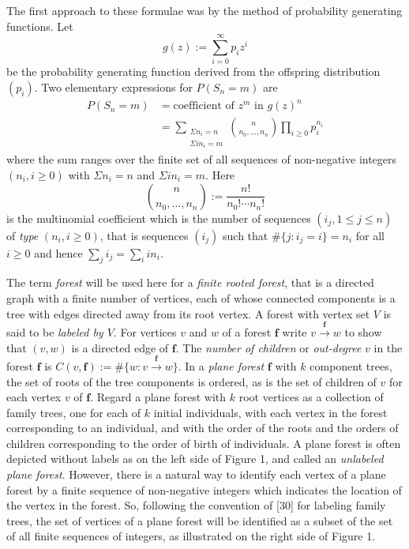 The first approach to these formulae was by the method of probability generating functions. Let
\[
g(z):=\sum_{i=0}^{\infty} p_i z^i \tag{6}
\]
be the probability generating function derived from the offspring distribution $(p_i)$. Two elementary expressions for $P(S_n=m)$ are
\begin{align}
P(S_n=m)&=\text{coefficient of } z^m \text{ in } g(z)^n \tag{7}\\
&=\sum_{\substack{\Sigma n_i=n\\ \Sigma i n_i=m}} \binom{n}{n_0,\ldots,n_n}\prod_{i\ge 0} p_i^{n_i} \tag{8}
\end{align}
where the sum ranges over the finite set of all sequences of non-negative integers $(n_i,i\ge 0)$ with $\Sigma n_i=n$ and $\Sigma i n_i=m$. Here
\[
\binom{n}{n_0,\ldots,n_n}:=\frac{n!}{n_0!\cdots n_n!} \tag{9}
\]
is the multinomial coefficient which is the number of sequences $(i_j,1\le j\le n)$ of \emph{type} $(n_i,i\ge 0)$, that is sequences $(i_j)$ such that $\#\{j: i_j=i\}=n_i$ for all $i\ge 0$ and hence $\sum_j i_j=\sum_i i n_i$.

The term \emph{forest} will be used here for a \emph{finite rooted forest}, that is a directed graph with a finite number of vertices, each of whose connected components is a tree with edges directed away from its root vertex. A forest with vertex set $V$ is said to be \emph{labeled by $V$}. For vertices $v$ and $w$ of a forest $\mathbf{f}$ write $v\xrightarrow{\mathbf{f}} w$ to show that $(v,w)$ is a directed edge of $\mathbf{f}$. The \emph{number of children} or \emph{out-degree} $v$ in the forest $\mathbf{f}$ is $C(v,\mathbf{f}):=\#\{w: v\xrightarrow{\mathbf{f}} w\}$. In a \emph{plane forest} $\mathbf{f}$ with $k$ component trees, the set of roots of the tree components is ordered, as is the set of children of $v$ for each vertex $v$ of $\mathbf{f}$. Regard a plane forest with $k$ root vertices as a collection of family trees, one for each of $k$ initial individuals, with each vertex in the forest corresponding to an individual, and with the order of the roots and the orders of children corresponding to the order of birth of individuals. A plane forest is often depicted without labels as on the left side of Figure 1, and called an \emph{unlabeled plane forest}. However, there is a natural way to identify each vertex of a plane forest by a finite sequence of non-negative integers which indicates the location of the vertex in the forest. So, following the convention of [30] for labeling family trees, the set of vertices of a plane forest will be identified as a subset of the set of all finite sequences of integers, as illustrated on the right side of Figure 1.

